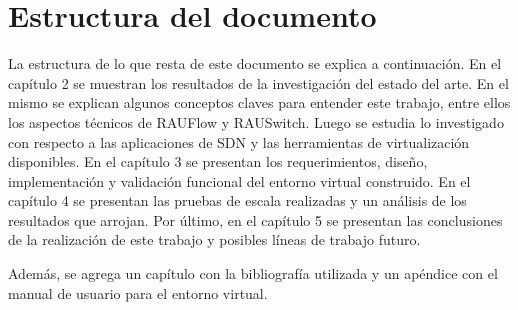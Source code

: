 \section{Estructura del documento}
La estructura de lo que resta de este documento se explica a continuación. En el capítulo 2 se muestran los resultados de la investigación del estado del arte. En el mismo se explican algunos conceptos claves para entender este trabajo, entre ellos los aspectos técnicos de RAUFlow y RAUSwitch. Luego se estudia lo investigado con respecto a las aplicaciones de SDN y las herramientas de virtualización disponibles. En el capítulo 3 se presentan los requerimientos, diseño, implementación y validación funcional del entorno virtual construido. En el capítulo 4 se presentan las pruebas de escala realizadas y un análisis de los resultados que arrojan. Por último, en el capítulo 5 se presentan las conclusiones de la realización de este trabajo y posibles líneas de trabajo futuro.

Además, se agrega un capítulo con la bibliografía utilizada y un apéndice con el manual de usuario para el entorno virtual.

